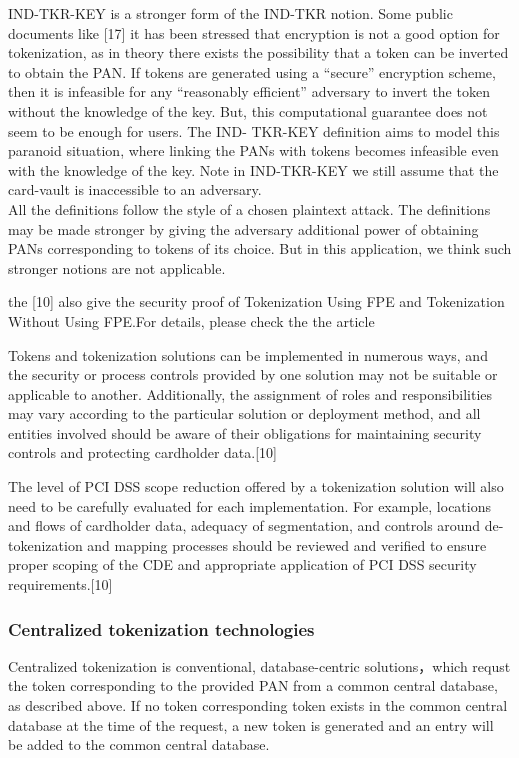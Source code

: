 \documentclass[journal]{IEEEtran}
\begin{document}
IND-TKR-KEY is a stronger form of the IND-TKR notion. Some public documents like [17] it has been stressed that encryption is not a good option for tokenization, as in theory there exists the possibility that a token can be inverted to obtain the PAN. If tokens are generated using a “secure” encryption scheme, then it is infeasible for any “reasonably efficient” adversary to invert the token without the knowledge of the key. But, this computational guarantee does not seem to be enough for users. The IND-
TKR-KEY definition aims to model this paranoid situation, where linking the PANs with tokens becomes infeasible even with the knowledge of the key. Note in IND-TKR-KEY we still assume that the card-vault is inaccessible to an adversary.
\\

All the definitions follow the style of a chosen plaintext attack. The definitions may be made stronger by giving the adversary additional power of obtaining PANs corresponding to tokens of its choice. But in this application, we think such stronger notions are not applicable.

the [10] also give the security proof of Tokenization Using FPE and Tokenization Without Using FPE.For details, please check the the article

Tokens and tokenization solutions can be implemented in numerous ways, and the security or process controls provided by one solution may not be suitable or applicable to another. Additionally, the assignment of roles and responsibilities may vary according to the particular solution or deployment method, and all entities involved should be aware of their obligations for maintaining security controls and protecting cardholder data.[10]

The level of PCI DSS scope reduction offered by a tokenization solution will also need to be carefully evaluated for each implementation. For example, locations and flows of cardholder data, adequacy of segmentation, and controls around de-tokenization and mapping processes should be reviewed and verified to ensure proper scoping of the CDE and appropriate application of PCI DSS security requirements.[10]
\subsubsection{Centralized tokenization technologies}
Centralized tokenization is conventional, database-centric solutions，which requst the token corresponding to the provided PAN from a common central database, as described above. If no token corresponding token exists in the common central database at the time of the request, a new token is generated and an entry will be added to the common central database.
\end{document}
